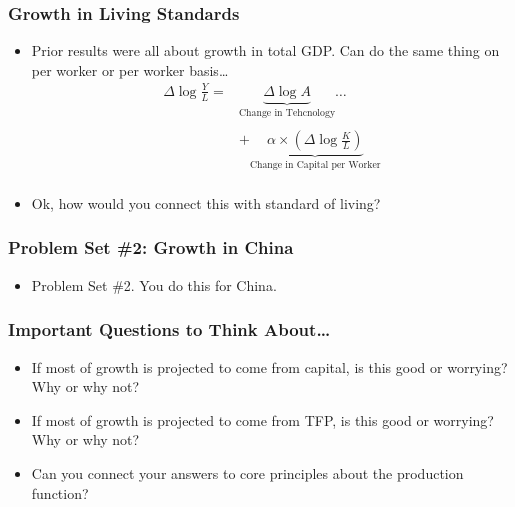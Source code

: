 \documentclass[handout]{beamer}
\begin{document}
\begin{frame}[t]
\frametitle{Growth in Living Standards}
\begin{itemize}
\item Prior results were all about growth in total GDP. Can do the same thing on per worker or per worker basis\ldots
\medskip
\begin{eqnarray*}
\Delta \log \frac{Y}{L} = & \underbrace{\Delta \log A}_{\mbox{Change in Tehcnology}} \dots \\
\\
& +  \underbrace{\alpha \times \left(\Delta \log \frac{K}{L} \right)}_{\mbox{Change in Capital per Worker}}\\
\end{eqnarray*}
\bigskip
\item Ok, how would you connect this with standard of living?
\end{itemize}
\end{frame}


\begin{frame}[t]
\frametitle{Problem Set \#2: Growth in China}
\begin{itemize}
\item Problem Set \#2. You do this for China.
\end{itemize}
\end{frame}



\begin{frame}[t]
\frametitle{Important Questions to Think About\ldots}
\begin{itemize}
\item If most of growth is projected to come from capital, is this good or worrying? Why or why not?
\bigskip
\item If most of growth is projected to come from TFP, is this good or worrying? Why or why not?
\bigskip
\item Can you connect your answers to core principles about the production function?
\end{itemize}
\end{frame}

\end{document}
